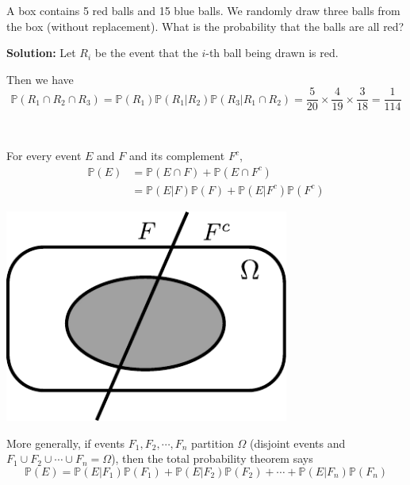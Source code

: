 \begin{eg}
    A box contains 5 red balls and 15 blue balls. We randomly draw three balls from the box (without replacement). What is the probability that the balls are all red?

    \textbf{Solution:} 
    Let \(R_i\) be the event that the \(i\)-th ball being drawn is red. 
    
    Then we have 
    \[
        \mathbb{P}(R_1 \cap R_2 \cap R_3) = \mathbb{P}(R_1)\mathbb{P}(R_1 \vert R_2)\mathbb{P}(R_3 \vert R_1 \cap R_2) = \dfrac{5}{20} \times \dfrac{4}{19} \times \dfrac{3}{18} = \dfrac{1}{114}
    \]
\end{eg}

\begin{theorem}~ 

    \begin{minipage}{0.7\textwidth}
        For every event \(E\) and \(F\) and its complement \(F^c\),
        \[
            \begin{aligned}
                \mathbb{P}(E) &= \mathbb{P}(E \cap F) + \mathbb{P}(E \cap F^c) \\
                &= \mathbb{P}(E \vert F)\mathbb{P}(F) + \mathbb{P}(E \vert F^c)\mathbb{P}(F^c)
            \end{aligned}
        \]
    \end{minipage}
    \begin{minipage}{0.3\textwidth}
        \centering
        \includegraphics[width=0.7\textwidth]{Figures/TPT.pdf}
    \end{minipage}
\end{theorem}

More generally, if events \(F_1, F_2, \cdots, F_n\) partition \(\Omega\) (disjoint events and \(F_1 \cup F_2 \cup \cdots \cup F_n = \Omega\)), then the total probability theorem says 
\[
    \mathbb{P}(E) = \mathbb{P}(E \vert F_1)\mathbb{P}(F_1) + \mathbb{P}(E \vert F_2)\mathbb{P}(F_2) + \cdots + \mathbb{P}(E \vert F_n)\mathbb{P}(F_n)
\]

